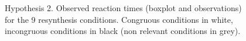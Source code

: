 \begin{figure}
\centering
{}
\caption{Hypothesis 2. Observed reaction times (boxplot and observations) for the 9 resynthesis conditions. Congruous conditions in white, incongruous conditions in black (non relevant conditions in grey).}
\label{fig503}\end{figure}
